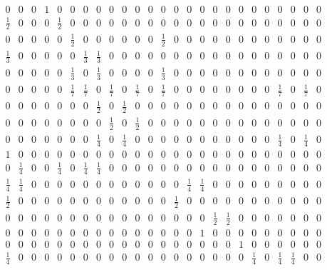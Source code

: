\documentclass[11pt]{report}
\begin{document}
{\begin{appendices}
\begin{figure} [h!]
\begin{equation*}
\begin{array}{ccccccccccccccccccccccccc}
0&0&0&1&0&0&0&0&0&0&0&0&0&0&0&0&0&0&0&0&0&0&0&0&0\\

\frac{1}{2}&0&0&0&\frac{1}{2}&0&0&0&0&0&0&0&0&0&0&0&0&0&0&0&0&0&0&0&0\\

0&0&0&0&0&\frac{1}{2}&0&0&0&0&0&0&\frac{1}{2}&0&0&0&0&0&0&0&0&0&0&0&0\\

\frac{1}{3}&0&0&0&0&0&\frac{1}{3}&\frac{1}{3}&0&0&0&0&0&0&0&0&0&0&0&0&0&0&0&0&0\\

0&0&0&0&0&\frac{1}{3}&0&\frac{1}{3}&0&0&0&0&\frac{1}{3}&0&0&0&0&0&0&0&0&0&0&0&0\\

0&0&0&0&0&\frac{1}{7}&\frac{1}{7}&0&\frac{1}{7}&0&\frac{1}{7}&0&\frac{1}{7}&0&0&0&0&0&0&0&0&\frac{1}{7}&0&\frac{1}{7}&0\\

0&0&0&0&0&0&0&\frac{1}{2}&0&\frac{1}{2}&0&0&0&0&0&0&0&0&0&0&0&0&0&0&0\\

0&0&0&0&0&0&0&0&\frac{1}{2}&0&\frac{1}{2}&0&0&0&0&0&0&0&0&0&0&0&0&0&0\\

0&0&0&0&0&0&0&\frac{1}{4}&0&\frac{1}{4}&0&0&0&0&0&0&0&0&0&0&0&\frac{1}{4}&0&\frac{1}{4}&0\\

1&0&0&0&0&0&0&0&0&0&0&0&0&0&0&0&0&0&0&0&0&0&0&0&0\\

0&\frac{1}{4}&0&0&\frac{1}{4}&0&\frac{1}{4}&\frac{1}{4}&0&0&0&0&0&0&0&0&0&0&0&0&0&0&0&0&0\\

\frac{1}{4}&\frac{1}{4}&0&0&0&0&0&0&0&0&0&0&0&0&\frac{1}{4}&\frac{1}{4}&0&0&0&0&0&0&0&0&0\\

\frac{1}{2}&0&0&0&0&0&0&0&0&0&0&0&0&\frac{1}{2}&0&0&0&0&0&0&0&0&0&0&0\\

0&0&0&0&0&0&0&0&0&0&0&0&0&0&0&0&\frac{1}{2}&\frac{1}{2}&0&0&0&0&0&0&0\\

0&0&0&0&0&0&0&0&0&0&0&0&0&0&0&1&0&0&0&0&0&0&0&0&0\\

0&0&0&0&0&0&0&0&0&0&0&0&0&0&0&0&0&0&1&0&0&0&0&0&0\\

\frac{1}{4}&0&0&0&0&0&0&0&0&0&0&0&0&0&0&0&0&0&0&\frac{1}{4}&0&\frac{1}{4}&\frac{1}{4}&0&0\\


\end{array}
\end{equation*}
\end{figure}
\end{appendices}}
\end{document}
